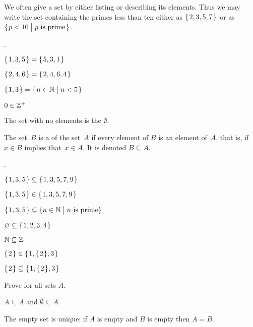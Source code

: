 \documentclass{ibl}
\begin{document}
We often give a set by either listing or describing its elements.
Thus we may write 
the set containing the primes less than ten 
either as $\set{2, 3, 5, 7}$ or as~$\set{p<10\suchthat \text{$p$ is prime}}$.

\begin{ex} \pord.
\begin{exes}
\item $\set{1,3,5}=\set{5,3,1}$    
\item $\set{2, 4, 6}=\set{2, 4, 6, 4}$    
\item $\set{1, 3}=\set{n\in\N\suchthat n<5}$ 
\item $0\in\Z^+$   
\end{exes}
\end{ex}

\begin{df}
The set with no elements is the  $\emptyset$.  
\end{df}

\begin{df}
The set~$B$ is a  of the set~$A$
if every element of $B$ is an element of~$A$,
that is, if $x\in B$ implies that~$x\in A$.
It is denoted $B\subseteq A$.
\end{df}

\begin{ex} \pord.
\begin{exes}
\item $\set{1,3,5}\subseteq\set{1,3, 5, 7, 9}$
\item $\set{1, 3, 5}\in\set{1, 3, 5, 7, 9}$   
\item $\set{1,3,5}\subseteq\setbuilder{n\in\N}{\text{$n$ is prime}}$
\item $\emptyset\subseteq\set{1, 2, 3, 4}$
\item $\N\subseteq\Z$
\item $\set{2}\in\set{1, \set{2}, 3}$
\item $\set{2}\subseteq\set{1, \set{2}, 3}$
\end{exes}
\end{ex}

\begin{ex} Prove for all sets $A$.
\begin{exes}
\item $A\subseteq A$ and $\emptyset\subseteq A$
\item The empty set is unique: if $A$ is empty and $B$ is empty then $A=B$.
\end{exes}
\end{ex}
\end{document}
